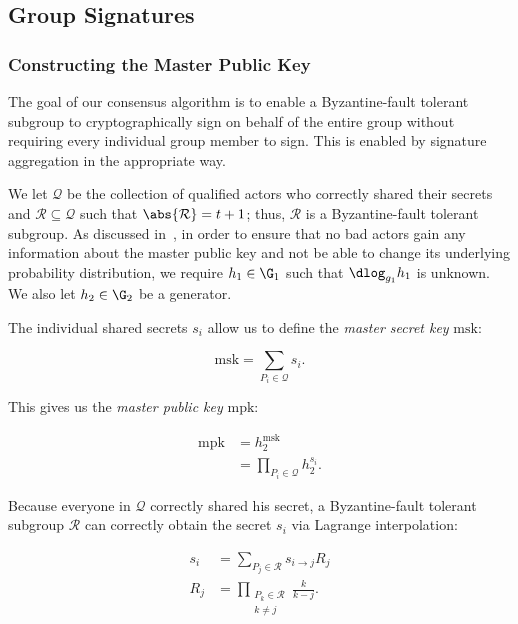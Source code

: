 \subsection{Group Signatures}
\label{ssec:crypto_group_sig}

\subsubsection{Constructing the Master Public Key}

The goal of our consensus algorithm is to enable a Byzantine-fault
tolerant subgroup to cryptographically sign on behalf of the entire
group without requiring every individual group member to sign.
This is enabled by signature aggregation in the appropriate way.

We let $\mathcal{Q}$ be the collection of qualified
actors who correctly shared their secrets and
$\mathcal{R}\subseteq\mathcal{Q}$ such that
$\abs{\mathcal{R}} = t+1$; thus, $\mathcal{R}$ is a
Byzantine-fault tolerant subgroup.
As discussed in~\cite{gennaro3revisiting,gennaro1999secure,ethdkg},
in order to ensure that no bad actors gain any information
about the master public key and not be able to change
its underlying probability distribution, we require
$h_{1}\in\G_{1}$ such that $\dlog_{g_{1}}h_{1}$ is unknown.
We also let $h_{2}\in\G_{2}$ be a generator.

The individual shared secrets $s_{i}$ allow us to define the
\emph{master secret key} $\text{msk}$:

\begin{equation}
    \text{msk} = \sum_{P_{i}\in\mathcal{Q}} s_{i}.
\end{equation}

\noindent
This gives us the \emph{master public key} $\text{mpk}$:

\begin{align}
    \text{mpk} &= h_{2}^{\text{msk}} \nonumber\\
        &= \prod_{P_{i}\in\mathcal{Q}} h_{2}^{s_{i}}.
\end{align}

\noindent
Because everyone in $\mathcal{Q}$ correctly shared his secret,
a Byzantine-fault tolerant subgroup $\mathcal{R}$ can
correctly obtain the secret $s_{i}$ via Lagrange interpolation:

\begin{align}
    s_{i} &= \sum_{P_{j}\in\mathcal{R}} s_{i\to j} R_{j} \nonumber\\
    R_{j} &= \prod_{\substack{P_{k}\in\mathcal{R} \\ k\ne j}} \frac{k}{k-j}.
    \label{eq:Rj_coefs}
\end{align}

